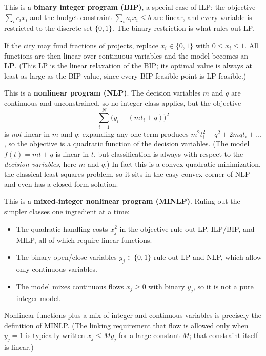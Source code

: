 
This is a \textbf{binary integer program (BIP)}, a special case of ILP: the objective $\sum_i c_i x_i$ and the budget constraint $\sum_i a_i x_i \leq b$ are linear, and every variable is restricted to the discrete set $\{0,1\}$. The binary restriction is what rules out LP.

If the city may fund fractions of projects, replace $x_i \in \{0,1\}$ with $0 \leq x_i \leq 1$. All functions are then linear over continuous variables and the model becomes an \textbf{LP}. (This LP is the linear relaxation of the BIP; its optimal value is always at least as large as the BIP value, since every BIP-feasible point is LP-feasible.)


This is a \textbf{nonlinear program (NLP)}. The decision variables $m$ and $q$ are continuous and unconstrained, so no integer class applies, but the objective
\[
\sum_{i=1}^N \big(y_i - (m t_i + q)\big)^2
\]
is \emph{not} linear in $m$ and $q$: expanding any one term produces $m^2 t_i^2 + q^2 + 2 m q t_i + \dots$, so the objective is a quadratic function of the decision variables. (The model $f(t) = mt + q$ is linear in $t$, but classification is always with respect to the \emph{decision variables}, here $m$ and $q$.) In fact this is a convex quadratic minimization, the classical least-squares problem, so it sits in the easy convex corner of NLP and even has a closed-form solution.


This is a \textbf{mixed-integer nonlinear program (MINLP)}. Ruling out the simpler classes one ingredient at a time:
\begin{itemize}
\item The quadratic handling costs $x_j^2$ in the objective rule out LP, ILP/BIP, and MILP, all of which require linear functions.
\item The binary open/close variables $y_j \in \{0,1\}$ rule out LP and NLP, which allow only continuous variables.
\item The model mixes continuous flows $x_j \geq 0$ with binary $y_j$, so it is not a pure integer model.
\end{itemize}
Nonlinear functions plus a mix of integer and continuous variables is precisely the definition of MINLP. (The linking requirement that flow is allowed only when $y_j = 1$ is typically written $x_j \leq M y_j$ for a large constant $M$; that constraint itself is linear.)

